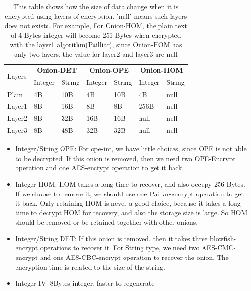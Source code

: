 \begin{table}
\renewcommand{\arraystretch}{1.3}
\begin{tabular}{p{0.8cm}|p{0.8cm}p{0.8cm}|p{0.8cm}p{0.8cm}|p{0.8cm}p{0.8cm}}%
\toprule
\multirow{2}{2cm}{Layers} & \multicolumn{2}{c}{\textbf{Onion-DET}} & \multicolumn{2}{c}{\textbf{Onion-OPE}} & \multicolumn{2}{c}{\textbf{Onion-HOM}}\\
\cmidrule{2-7}
& Integer & String & Integer & String & Integer & String\\
\midrule
Plain & 4B & 10B & 4B & 10B & 4B & null \\
Layer1 & 8B & 16B & 8B & 8B & 256B & null \\
Layer2 & 8B & 32B & 16B & 16B & null & null \\
Layer3 & 8B & 48B & 32B & 32B & null & null \\
\bottomrule
\end{tabular}
\caption{This table shows how the size of data change when it is encrypted using layers of encryption. 'null' means such layers does not exists. For example, For Onion-HOM, the plain text of 4 Bytes integer will become 256 Bytes when encrypted with the layer1 algorithm(Pailliar), since Onion-HOM has only two layers, the value for layer2 and layer3 are null}
\label{tab:encryption-size}
\end{table}


\begin{itemize}
\item Integer/String OPE: For ope-int, we have little choices, since OPE is not able to be decrypted. If this onion is removed, then we need two OPE-Encrypt operation and one AES-enctypt operation to get it back. 
\item Integer HOM: HOM takes a long time to recover, and also occupy 256 Bytes. If we choose to remove it, we should use one Paillar-encrypt operation to get it back. Only retaining HOM is never a good choice, because it takes a long time to decrypt HOM for recovery, and also the storage size is large. So HOM should be removed or be retained together with other onions.
\item Integer/String DET: If this onion is removed, then it takes three blowfish-encrypt operations to recover it. For String type, we need two AES-CMC-encrypt and one AES-CBC-encrypt operation to recover the onion. The encryption time is related to the size of the string.
\item Integer IV: 8Bytes integer. faster to regenerate
\end{itemize}


